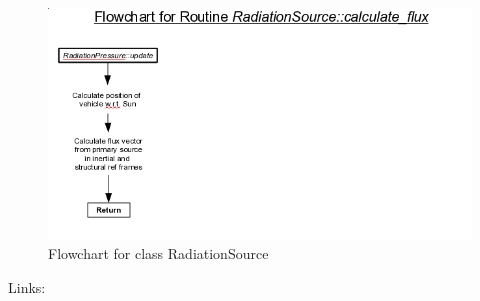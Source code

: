\begin{figure}[!ht]
  \includegraphics[width = 6 in]{figs/flowchart/flow_calculate_flux.png}
  \caption{Flowchart for class RadiationSource }
  \label{fig:flow_calculate_flux}
\end{figure}
Links: \newline
{}\newline
\clearpage


